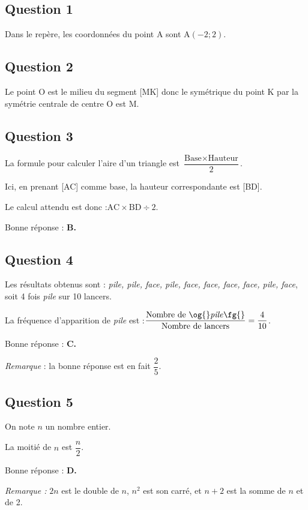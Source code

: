 \subsection*{Question 1}
Dans le repère, les coordonnées du point A sont A$(-2 ; 2)$.

\subsection*{Question 2}
Le point O est le milieu du segment [MK] donc le symétrique du point K par la symétrie centrale de centre O est M.

\subsection*{Question 3}
La formule pour calculer l'aire d'un triangle est \quad $\dfrac{\text{Base}\times \text{Hauteur}}{2}$.

Ici, en prenant [AC] comme base, la hauteur correspondante est [BD].

Le calcul attendu est donc :\quad $\mathrm{AC} \times \mathrm{BD}\div 2$.

Bonne réponse : \textbf{B.}

\subsection*{Question 4}
Les résultats obtenus sont : \emph{pile, pile, face, pile, face, face, face, face, pile, face}, soit 4 fois \emph{pile} sur 10 lancers.

La fréquence d'apparition de \og \emph{pile} \fg{} est :\quad  $\dfrac{\text{Nombre de \og{}\emph{pile}\fg{}}}{\text{Nombre de lancers}} = \dfrac{4}{10}$.

Bonne réponse : \textbf{C.}

\emph{Remarque} : la \og bonne \fg{} réponse est en fait $\dfrac25$.

\subsection*{Question 5}

On note $n$ un nombre entier.

La moitié de $n$ est $\dfrac{n}{2}$.

Bonne réponse : \textbf{D.}

\emph{Remarque :} $2n$ est le double de $n$, $n^2$ est son carré, et $n+2$ est la somme de $n$ et de 2.

